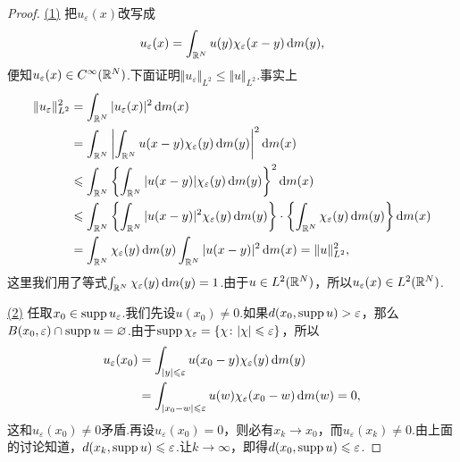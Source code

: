 \begin{proof}
	\hyperlink{6.1.1}{(1)}
	把$u_\varepsilon(x)$改写成
	\[u_\varepsilon(x)=\int_{\mathbb R^N}u(y)\chi_\varepsilon(x-y)\mathop{}\!\mathrm{d} m(y),\]
	便知$u_\varepsilon(x)\in C^\infty(\mathbb R^N)$.下面证明$\Vert u_\varepsilon\Vert_{L^2}\le\Vert u\Vert_{L^2}$.事实上
	\begin{align*}
		\Vert u_\varepsilon\Vert_{L^2}^2
		&=\int_{\MR^N}|u_\varepsilon(x)|^2 \dif m(x)\\
		&=\int_{\MR^N}\left|\int_{\MR^N} u(x-y)\chi_\varepsilon(y)\dif m(y)\right|^2\dif m(x)\\
		&\le\int_{\MR^N}\left\{\int_{\MR^N}|u(x-y)|\chi_\varepsilon(y)\dif m(y)\right\}^2\dif m(x)\\
		&\le\int_{\MR^N}\left\{\int_{\MR^N}|u(x-y)|^2\chi_\varepsilon(y)\dif m(y)\right\}\cdot\left\{\int_{\MR^N}\chi_\varepsilon(y)\dif m(y)\right\}\dif m(x)\\
		&=\int_{\MR^N} \chi_\varepsilon(y)\dif m(y)\int_{\MR^N}|u(x-y)|^2\dif m(x)=\Vert u\Vert_{L^2}^2,
	\end{align*}
这里我们用了等式$\int_{\mathbb R^N}\chi_\varepsilon(y)\mathop{}\!\mathrm{d} m(y)=1$.由于$u\in L^2(\mathbb R^N)$，所以$u_\varepsilon(x)\in L^2(\mathbb R^N)$.

\hyperlink{6.1.1}{(2)}
任取$x_0\in\operatorname{supp} u_\varepsilon$.我们先设$u(x_0)\neq0$.如果$d(x_0,\operatorname{supp} u)>\varepsilon$，那么$B(x_0,\varepsilon)\cap\operatorname{supp} u=\varnothing$.由于$\operatorname{supp}\chi_\varepsilon=\{\chi\colon|\chi|\leqslant\varepsilon\}$，所以
\begin{align*}
	u_\varepsilon(x_0)
	&=\int_{|y|\leqslant\varepsilon}u(x_0-y)\chi_\varepsilon(y)\mathop{}\!\mathrm{d} m(y)\\
	&=\int_{|x_0-w|\leqslant\varepsilon}u(w)\chi_\varepsilon(x_0-w)\mathop{}\!\mathrm{d} m(w)=0,
\end{align*}
这和$u_\varepsilon(x_0)\neq0$矛盾.再设$u_\varepsilon(x_0)=0$，则必有$x_k\to x_0$，而$u_\varepsilon(x_k)\neq0$.由上面的讨论知道，$d(x_k,\operatorname{supp} u)\leqslant\varepsilon$.让$k\to\infty$，即得$d(x_0,\operatorname{supp} u)\leqslant\varepsilon$.


\end{proof}
